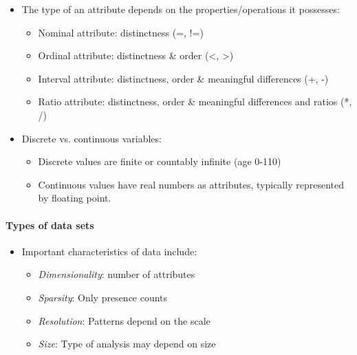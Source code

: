 \documentclass[11pt]{article}
\providecommand{\tightlist}{%
      \setlength{\itemsep}{0pt}\setlength{\parskip}{0pt}}
\begin{document}
    \begin{itemize}
\tightlist
\item
  The type of an attribute depends on the properties/operations it
  possesses:

  \begin{itemize}
  \tightlist
  \item
    Nominal attribute: distinctness (=, !=)
  \item
    Ordinal attribute: distinctness \& order (\textless{},
    \textgreater{})
  \item
    Interval attribute: distinctness, order \& meaningful differences
    (+, -)
  \item
    Ratio attribute: distinctness, order \& meaningful differences and
    ratios (*, /)
  \end{itemize}
\end{itemize}

    \begin{itemize}
\tightlist
\item
  Discrete vs. continuous variables:

  \begin{itemize}
  \tightlist
  \item
    Discrete values are finite or countably infinite (age 0-110)
  \item
    Continuous values have real numbers as attributes, typically
    represented by floating point.
  \end{itemize}
\end{itemize}

    \paragraph{Types of data sets}\label{types-of-data-sets}

    \begin{itemize}
\tightlist
\item
  Important characteristics of data include:

  \begin{itemize}
  \tightlist
  \item
    \emph{Dimensionality}: number of attributes
  \item
    \emph{Sparsity}: Only presence counts
  \item
    \emph{Resolution}: Patterns depend on the scale
  \item
    \emph{Size}: Type of analysis may depend on size
  \end{itemize}
\end{itemize}
\end{document}
